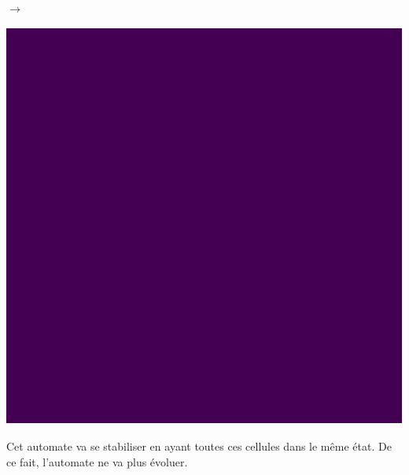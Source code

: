 \documentclass[12pt, a4paper]{article}
\begin{document}
\begin{center}
\begin{minipage}{.17\linewidth}
                \end{minipage}
                $\rightarrow$
                \begin{minipage}{.17\linewidth}
                    \includegraphics[scale=0.15]{img/part3/2/step4.png}
                \end{minipage}
            \end{center}
            Cet automate va se stabiliser en ayant toutes ces cellules dans le même état. De ce fait, l'automate ne va plus évoluer.
\end{document}
